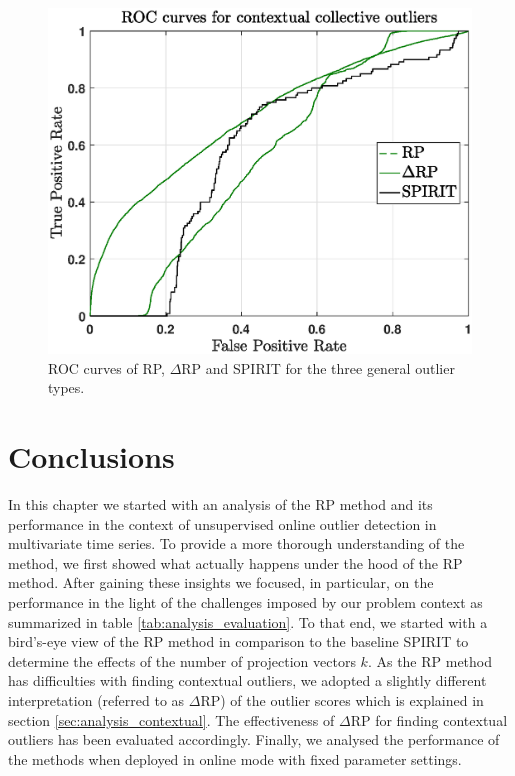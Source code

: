 \begin{figure}[h]
\begin{minipage}{0.333\textwidth}
	\end{minipage}
	\begin{minipage}{0.333\textwidth}
		\centering
		\includegraphics[scale=0.28]{analysis/ROCs_collective}
	\end{minipage}
	\caption{ROC curves of RP, $\Delta$RP and SPIRIT for the three general outlier types.}
	\label{fig:analysis_rocs_point}
\end{figure}


\section{Conclusions}
\label{sec:analysis_concluding}
In this chapter we started with an analysis of the RP method and its performance in the context of unsupervised online outlier detection in multivariate time series. To provide a more thorough understanding of the method, we first showed what actually happens under the hood of the RP method. After gaining these insights we focused, in particular, on the performance in the light of the challenges imposed by our problem context as summarized in table \ref{tab:analysis_evaluation}. To that end, we started with a bird's-eye view of the RP method in comparison to the baseline SPIRIT to determine the effects of the number of projection vectors $k$. As the RP method has difficulties with finding contextual outliers, we adopted a slightly different interpretation (referred to as $\Delta$RP) of the outlier scores which is explained in section \ref{sec:analysis_contextual}. The effectiveness of $\Delta$RP for finding contextual outliers has been evaluated accordingly. Finally, we analysed the performance of the methods when deployed in online mode with fixed parameter settings.

